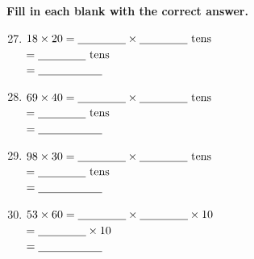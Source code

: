 \documentclass[11pt, a4paper]{article}
\begin{document}
\vspace{2cm}
\textbf{Fill in each blank with the correct answer.}

\begin{enumerate}[label=\arabic*.]
    \setcounter{enumi}{26}
    \item $18 \times 20 = \text{\underline{\hspace{1.5cm}}} \times \text{\underline{\hspace{1.5cm}}} \text{ tens}$ \\
    \phantom{$18 \times 20$} $= \text{\underline{\hspace{1.5cm}}} \text{ tens}$ \\
    \phantom{$18 \times 20$} $= \text{\underline{\hspace{2cm}}}$

    \item $69 \times 40 = \text{\underline{\hspace{1.5cm}}} \times \text{\underline{\hspace{1.5cm}}} \text{ tens}$ \\
    \phantom{$69 \times 40$} $= \text{\underline{\hspace{1.5cm}}} \text{ tens}$ \\
    \phantom{$69 \times 40$} $= \text{\underline{\hspace{2cm}}}$

    \setcounter{enumi}{28}
    \item $98 \times 30 = \text{\underline{\hspace{1.5cm}}} \times \text{\underline{\hspace{1.5cm}}} \text{ tens}$ \\
    \phantom{$98 \times 30$} $= \text{\underline{\hspace{1.5cm}}} \text{ tens}$ \\
    \phantom{$98 \times 30$} $= \text{\underline{\hspace{2cm}}}$

    \item $53 \times 60 = \text{\underline{\hspace{1.5cm}}} \times \text{\underline{\hspace{1.5cm}}} \times 10$ \\
    \phantom{$53 \times 60$} $= \text{\underline{\hspace{1.5cm}}} \times 10$ \\
    \phantom{$53 \times 60$} $= \text{\underline{\hspace{2cm}}}$


\end{enumerate}
\end{document}
